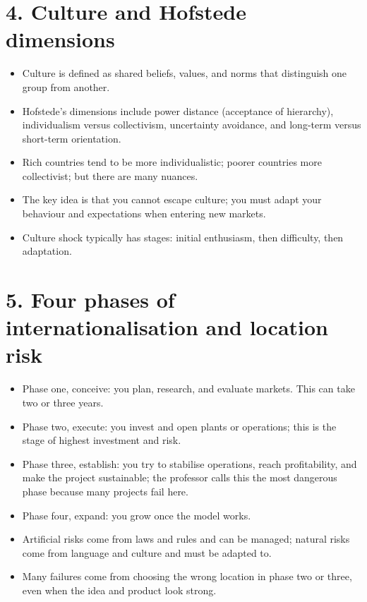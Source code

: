 \documentclass[10pt,a4paper]{article}
\begin{document}
\section*{4. Culture and Hofstede dimensions}
\begin{itemize}
\item Culture is defined as shared beliefs, values, and norms that distinguish one group from another.
\item Hofstede’s dimensions include power distance (acceptance of hierarchy), individualism versus collectivism, uncertainty avoidance, and long-term versus short-term orientation.
\item Rich countries tend to be more individualistic; poorer countries more collectivist; but there are many nuances.
\item The key idea is that you cannot escape culture; you must adapt your behaviour and expectations when entering new markets.
\item Culture shock typically has stages: initial enthusiasm, then difficulty, then adaptation.
\end{itemize}

\section*{5. Four phases of internationalisation and location risk}
\begin{itemize}
\item Phase one, conceive: you plan, research, and evaluate markets. This can take two or three years.
\item Phase two, execute: you invest and open plants or operations; this is the stage of highest investment and risk.
\item Phase three, establish: you try to stabilise operations, reach profitability, and make the project sustainable; the professor calls this the most dangerous phase because many projects fail here.
\item Phase four, expand: you grow once the model works.
\item Artificial risks come from laws and rules and can be managed; natural risks come from language and culture and must be adapted to.
\item Many failures come from choosing the wrong location in phase two or three, even when the idea and product look strong.
\end{itemize}
\end{document}
